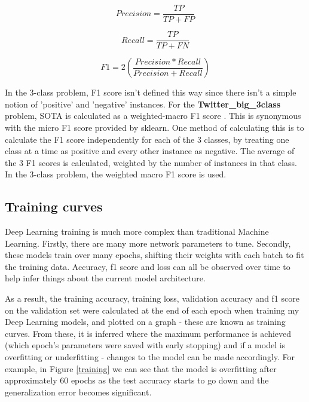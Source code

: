\documentclass[12pt,a4paper]{article}
\begin{document}
\begin{multicols}{2}
	\begin{equation}
	{Precision = \frac{TP}{TP+FP} }
	\end{equation}
	
	\begin{equation}
	{Recall = \frac{TP}{TP+FN} }
	\end{equation}
	
	\begin{equation}
	{F1 = 2 ( \frac{Precision*Recall}{Precision+Recall} )}
	\end{equation}
\end{multicols}

In the 3-class problem, F1 score isn't defined this way since there isn't a simple notion of 'positive' and 'negative' instances. For the \textbf{Twitter\_big\_3class} problem, SOTA is calculated as a weighted-macro F1 score \cite{Badjatiya}. This is synonymous with the micro F1 score provided by sklearn. One method of calculating this is to calculate the F1 score independently for each of the 3 classes, by treating one class at a time as positive and every other instance as negative. The average of the 3 F1 scores is calculated, weighted by the number of instances in that class. In the 3-class problem, the weighted macro F1 score is used.

\subsection{Training curves}
Deep Learning training is much more complex than traditional Machine Learning. Firstly, there are many more network parameters to tune. Secondly, these models train over many epochs, shifting their weights with each batch to fit the training data. Accuracy, f1 score and loss can all be observed over time to help infer things about the current model architecture.

As a result, the training accuracy, training loss, validation accuracy  and f1 score on the validation set were calculated at the end of each epoch when training my Deep Learning models, and plotted on a graph - these are known as training curves. From these, it is inferred where the maximum performance is achieved (which epoch's parameters were saved with early stopping) and if a model is overfitting or underfitting - changes to the model can be made accordingly. For example, in Figure \ref{training} we can see that the model is overfitting after approximately 60 epochs as the test accuracy starts to go down and the generalization error becomes significant.
\end{document}
